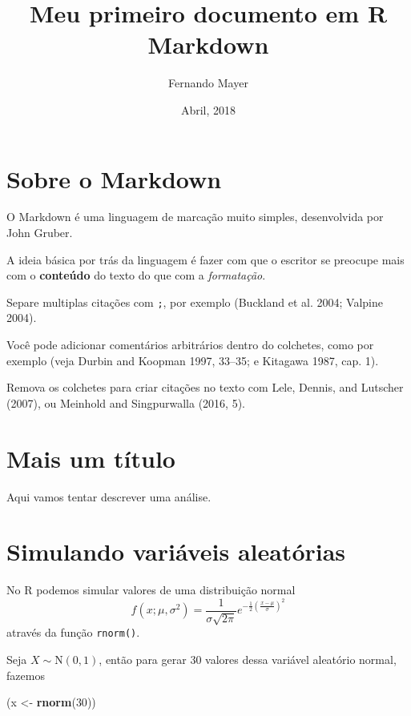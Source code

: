 \documentclass[]{article}
\title{Meu primeiro documento em R Markdown}
\author{Fernando Mayer}
\date{Abril, 2018}
\newenvironment{Shaded}{\begin{snugshade}}{\end{snugshade}}
\newcommand{\DecValTok}[1]{\textcolor[rgb]{0.00,0.00,0.81}{#1}}
\newcommand{\KeywordTok}[1]{\textcolor[rgb]{0.13,0.29,0.53}{\textbf{#1}}}
\newcommand{\NormalTok}[1]{#1}
\newcommand{\StringTok}[1]{\textcolor[rgb]{0.31,0.60,0.02}{#1}}
\begin{document}
\maketitle

{
\setcounter{tocdepth}{2}
\tableofcontents
}
\hypertarget{sobre-o-markdown}{%
\section{Sobre o Markdown}\label{sobre-o-markdown}}

O Markdown é uma linguagem de marcação muito simples, desenvolvida por
John Gruber.

A ideia básica por trás da linguagem é fazer com que o escritor se
preocupe mais com o \textbf{conteúdo} do texto do que com a
\emph{formatação}.

Separe multiplas citações com \texttt{;}, por exemplo (Buckland et al.
2004; Valpine 2004).

Você pode adicionar comentários arbitrários dentro do colchetes, como
por exemplo (veja Durbin and Koopman 1997, 33--35; e Kitagawa 1987, cap.
1).

Remova os colchetes para criar citações no texto com Lele, Dennis, and
Lutscher (2007), ou Meinhold and Singpurwalla (2016, 5).

\hypertarget{mais-um-titulo}{%
\section{Mais um título}\label{mais-um-titulo}}

Aqui vamos tentar descrever uma análise.

\hypertarget{simulando-variaveis-aleatorias}{%
\section{Simulando variáveis
aleatórias}\label{simulando-variaveis-aleatorias}}

No R podemos simular valores de uma distribuição normal \[
f(x;\mu,\sigma^2) = \frac{1}{\sigma\sqrt{2\pi}}
e^{ -\frac{1}{2}\left(\frac{x-\mu}{\sigma}\right)^2 }
\] através da função \texttt{rnorm()}.

Seja \(X \sim \text{N}(0,1)\), então para gerar 30 valores dessa
variável aleatório normal, fazemos

\begin{Shaded}
\begin{Highlighting}[]
\NormalTok{(x <-}\StringTok{ }\KeywordTok{rnorm}\NormalTok{(}\DecValTok{30}\NormalTok{))}
\end{Highlighting}
\end{Shaded}
\end{document}
